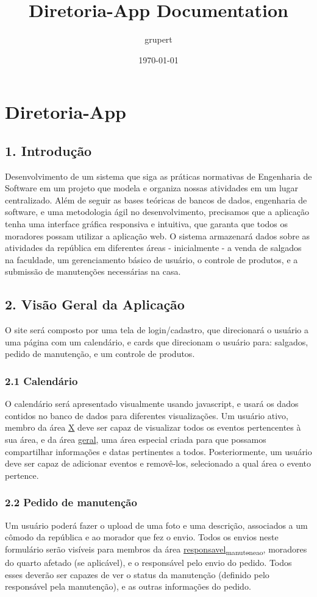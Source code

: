 \documentclass[11pt]{article}
\author{grupert}
\date{\today}
\title{Diretoria-App Documentation}
\begin{document}
\maketitle
\tableofcontents

\section{Diretoria-App}
\label{sec:org5556508}
\subsection{1. Introdução}
\label{sec:org7a4c75a}
Desenvolvimento de um sistema que siga as práticas normativas de Engenharia de Software em um projeto que modela e organiza nossas atividades em um lugar centralizado.
Além de seguir as bases teóricas de bancos de dados, engenharia de software, e uma metodologia ágil no desenvolvimento, precisamos que a aplicação tenha uma interface gráfica responsiva e intuitiva, que garanta que todos os moradores possam utilizar a aplicação web.
O sistema armazenará dados sobre as atividades da república em diferentes áreas - inicialmente - a venda de salgados na faculdade, um gerenciamento básico de usuário, o controle de produtos, e a submissão de manutenções necessárias na casa.
\subsection{2. Visão Geral da Aplicação}
\label{sec:orga6c0ba0}
O site será composto por uma tela de login/cadastro, que direcionará o usuário a uma página com um calendário, e cards que direcionam o usuário para: salgados, pedido de manutenção, e um controle de produtos. 
\subsubsection{2.1 Calendário}
\label{sec:org43feda5}
O calendário será apresentado visualmente usando javascript, e usará os dados contidos no banco de dados para diferentes visualizações. Um usuário ativo, membro da área \uline{X} deve ser capaz de visualizar todos os eventos pertencentes à sua área, e da área \uline{geral}, uma área especial criada para que possamos compartilhar informações e datas pertinentes a todos.
Posteriormente, um usuário deve ser capaz de adicionar eventos e removê-los, selecionado a qual área o evento pertence.
\subsubsection{2.2 Pedido de manutenção}
\label{sec:org5b21fbc}
Um usuário poderá fazer o upload de uma foto e uma descrição, associados a um cômodo da república e ao morador que fez o envio. Todos os envios neste formulário serão visíveis para membros da área \uline{responsavel\textsubscript{manutencao}}, moradores do quarto afetado (se aplicável), e o responsável pelo envio do pedido. Todos esses deverão ser capazes de ver o status da manutenção (definido pelo responsável pela manutenção), e as outras informações do pedido.
\end{document}
